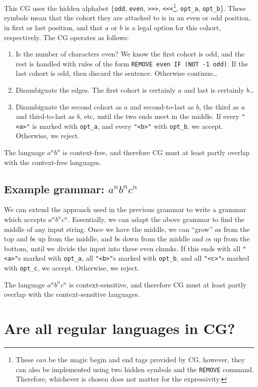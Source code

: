 \documentclass[11pt]{article}
\def\t#1{\texttt{#1}}
\begin{document}
This CG uses the hidden alphabet \{\t{odd}, \t{even}, \t{>>>}, \t{<<<}\footnote{
  These \emph{can} be the magic begin and end tags provided by CG, however, they
  can also be implemented using two hidden symbols and the \t{REMOVE} command.
  Therefore, whichever is chosen does not matter for the expressivity.
}, \t{opt\_a}, \t{opt\_b}\}.
These symbols mean that the cohort they are attached to is in an even or odd
position, in first or last position, and that $a$ or $b$ is a legal option for
this cohort, respectively. 
The CG operates as follows:
\begin{enumerate}
\item
  Is the number of characters even? We know the first cohort is odd, and the
  rest is handled with rules of the form \t{REMOVE even IF (NOT -1 odd)}. If the
  last cohort is odd, then discard the sentence. Otherwise continue\dots
\item
  Disambiguate the edges. The first cohort is certainly $a$ and last is
  certainly $b$\dots
\item
  Disambiguate the second cohort as $a$ and second-to-last as $b$, the third as
  $a$ and third-to-last as $b$, etc, until the two ends meet in the middle. If
  every \t{"<a>"} is marked with \t{opt\_a}, and every \t{"<b>"} with
  \t{opt\_b}, we accept. Otherwise, we reject.  
\end{enumerate}
The language $a^nb^n$ is context-free, and therefore CG must at least partly
overlap with the context-free languages.

\subsection{Example grammar: $a^nb^nc^n$}

We can extend the approach used in the previous grammar to write a grammar which
accepts $a^nb^nc^n$. Essentially, we can adapt the above grammar to find the
middle of any input string. Once we have the middle, we can ``grow'' $a$s from
the top and $b$s up from the middle, and $b$s down from the middle and $c$s up
from the bottom, until we divide the input into three even chunks.
If this ends with all \t{"<a>"}s marked with \t{opt\_a}, all \t{"<b>"}s marked
with \t{opt\_b}, and all \t{"<c>"}s marked with \t{opt\_c}, we accept.
Otherwise, we reject.

The language $a^nb^nc^n$ is context-sensitive, and therefore CG must at least
partly overlap with the context-sensitive languages. 


\section{Are all regular languages in CG?}
\end{document}
